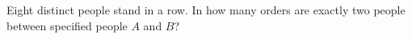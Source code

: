 Eight distinct people stand in a row. In how many orders are exactly two people between specified people $A$ and $B$?
